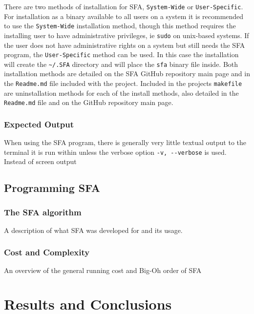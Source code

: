 \documentclass[12pt, oneside]{smuthesis}
\begin{document}
There are two methods of installation for SFA, \verb|System-Wide| or \verb|User-Specific|. For installation as a binary available to all users on a system it is recommended to use the \verb|System-Wide| installation method, though this method requires the installing user to have administrative privileges, ie \verb|sudo| on unix-based systems. If the user does not have administrative rights on a system but still needs the SFA program, the \verb|User-Specific| method can be used. In this case the installation will create the \verb|~/.SFA| directory and will place the \verb|sfa| binary file inside. Both installation methods are detailed on the SFA GitHub repository main page and in the \verb|Readme.md| file included with the project. Included in the projects \verb|makefile| are uninstallation methods for each of the install methods, also detailed in the \verb|Readme.md| file and on the GitHub repository main page.

\subsection{\sc Expected Output} \label{expectedOutput}

When using the SFA program, there is generally very little textual output to the terminal it is run within unless the verbose option \verb|-v, --verbose| is used. Instead of screen output 

\section{\sc Programming SFA} \label{programmingSFA}

\subsection{\sc The SFA algorithm} \label{algorithm}

A description of what SFA was developed for and its usage.

\subsection{\sc Cost and Complexity} \label{costComplexity}

An overview of the general running cost and Big-Oh order of SFA

\chapter{\sc Results and Conclusions} \label{resultsConclusions}
\end{document}
